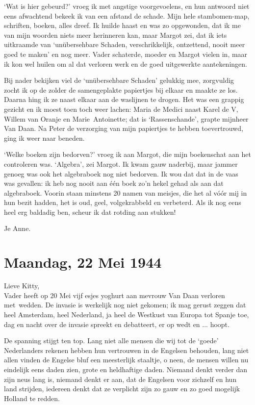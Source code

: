 \documentclass{book}
\begin{document}
`Wat is hier gebeurd?' vroeg ik met angstige voorgevoelens, en hun
antwoord niet eens afwachtend bekeek ik van een afstand de schade. Mijn
hele stambomen-map, schriften, boeken, alles dreef. Ik huilde haast en
was zo opgewonden, dat ik me van mijn woorden niets meer herinneren kan,
maar Margot zei, dat ik iets uitkraamde van `unübersehbare Schaden,
verschrikkelijk, ontzettend, nooit meer goed te maken' en nog meer.
Vader schaterde, moeder en Margot vielen in, maar ik kon wel huilen om
al dat verloren werk en de goed uitgewerkte aantekeningen.

Bij nader bekijken viel de `unübersehbare Schaden' gelukkig mee,
zorgvuldig zocht ik op de zolder de samengeplakte papiertjes bij elkaar
en maakte ze los. Daarna hing ik ze naast elkaar aan de waslijnen te
drogen. Het was een grappig gezicht en ik moest toen toch weer lachen:
Maria de Medici naast Karel de V, Willem van Oranje en Marie~Antoinette;
dat is `Rassenschande', grapte mijnheer Van Daan. Na Peter de verzorging
van mijn papiertjes te hebben toevertrouwd, ging ik weer naar beneden.

`Welke boeken zijn bedorven?' vroeg ik aan Margot, die mijn boekenschat
aan het controleren was. `Algebra', zei Margot. Ik kwam gauw naderbij,
maar jammer genoeg was ook het algebraboek nog niet bedorven. Ik wou dat
dat in de vaas was gevallen: ik heb nog nooit aan één boek zo'n hekel
gehad als aan dat algebraboek. Voorin staan minstens 20 namen van
meisjes, die het al vóór mij in hun bezit hadden, het is oud, geel,
volgekrabbeld en verbeterd. Als ik nog eens heel erg baldadig ben,
scheur ik dat rotding aan stukken!

Je Anne.

\chapter{Maandag, 22 Mei 1944}

Lieve Kitty,\\Vader heeft op 20 Mei vijf esjes yoghurt aan mevrouw Van
Daan verloren met~wedden. De invasie is werkelijk nog niet gekomen; ik
mag gerust zeggen dat heel Amsterdam, heel Nederland, ja heel de
Westkust van Europa tot Spanje toe, dag en nacht over de invasie spreekt
en debatteert, er op wedt en ... hoopt.

De spanning stijgt ten top. Lang niet alle mensen die wij tot de `goede'
Nederlanders rekenen hebben hun vertrouwen in de Engelsen behouden, lang
niet allen vinden de Engelse bluf een meesterlijk staaltje, o neen, de
mensen willen nu eindelijk eens daden zien, grote en heldhaftige daden.
Niemand denkt verder dan zijn neus lang is, niemand denkt er aan, dat de
Engelsen voor zichzelf en hun land strijden, iedereen denkt dat ze
verplicht zijn zo gauw en zo goed mogelijk Holland te redden.
\end{document}
